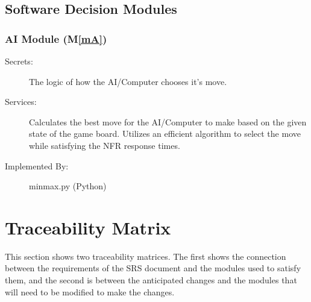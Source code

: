 \documentclass[12pt, titlepage]{article}
\newcommand{\mref}[1]{M\ref{#1}}
\begin{document}
\subsection{Software Decision Modules}

\subsubsection{AI Module (\mref{mA})}
\begin{description}
\item[Secrets:] The logic of how the AI/Computer chooses it's move.
\item[Services:] Calculates the best move for the AI/Computer to make based on the given state of the game board. Utilizes an efficient algorithm to select the move while satisfying the NFR response times.
\item[Implemented By:] minmax.py (Python)
\end{description}

\section{Traceability Matrix} \label{SecTM}

This section shows two traceability matrices. The first shows the connection between the requirements of the SRS document and the modules used to satisfy them, and the second is between the anticipated changes and the modules that will need to be modified to make the changes.
\end{document}
